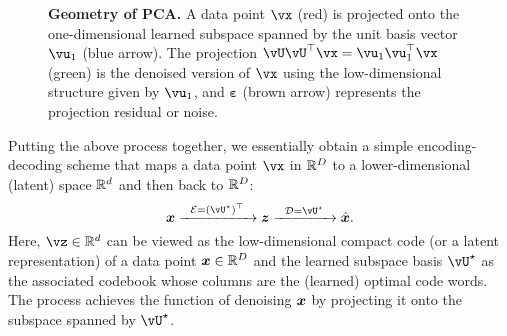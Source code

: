 \documentclass[\toplevelprefix/book-main.tex]{subfiles}
\begin{document}
\begin{figure}
    \centering
    \caption{\small \textbf{Geometry of PCA.} A data point $\vx$ (red) is projected onto the one-dimensional learned subspace spanned by the unit basis vector $\vu_1$ (blue arrow). The projection $\vU\vU^\top\vx = \vu_{1}\vu_{1}^{\top}\vx$ (green) is the denoised version of $\vx$ using the low-dimensional structure given by $\vu_{1}$, and $\boldsymbol{\varepsilon}$ (brown arrow) represents the projection residual or noise.}
    \label{fig:pca-geometry}
\end{figure}

Putting the above process together, we essentially obtain a simple encoding-decoding scheme that maps a data point $\vx$ in $\mathbb{R}^D$ to a lower-dimensional (latent) space $\mathbb{R}^d$ and then back to $\mathbb{R}^D$:
\begin{equation}
\x \xrightarrow{\hspace{2mm} \mathcal{E} = (\vU^\star)^\top \hspace{2mm}}  \z
    \xrightarrow{\hspace{2mm} \mathcal{D} = \vU^\star \hspace{2mm}}   \hat{\x}.  
\label{eqn:autoencoding-PCA}
\end{equation}
Here, $\vz \in \R^d$ can be viewed as the low-dimensional compact code (or
a latent representation) of a data point  $\bm{x} \in \mathbb{R}^D$ and the learned subspace
basis $\vU^\star$ as the associated codebook whose columns are the (learned)
optimal code words. The process achieves the function of denoising $\bm{x}$ by
projecting it onto the subspace spanned by $\vU^\star$.
\end{document}
